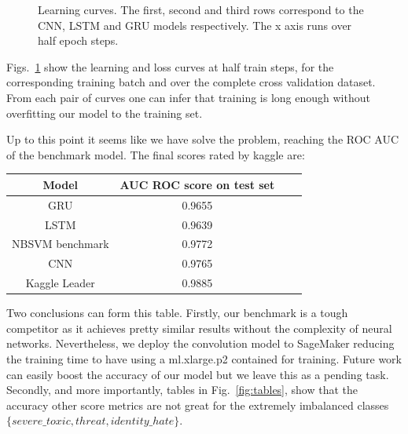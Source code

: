 \documentclass{report}
\begin{document}
\begin{figure}[!t]
{}\qquad
{}
\caption{Learning curves. The first, second and third rows correspond
to the CNN, LSTM and GRU models respectively. The x axis runs over half epoch steps.}\label{fig:curves}
\end{figure}

Figs.~\ref{fig:curves} show the learning and loss curves at
half train steps, for the corresponding training batch and over the complete 
cross validation dataset. From each pair of curves one can infer that training is
long enough without overfitting our model to the training set. 


Up to this point it seems like we have solve the problem, reaching the ROC AUC of 
the benchmark model. The final scores rated by kaggle are:
\begin{center}
\begin{tabular}{ |c|c|c|c| } 
\hline
 Model & AUC ROC score on test set\\
 \hline
GRU & 0.9655 \\ 
LSTM & 0.9639 \\ 
NBSVM benchmark&  0.9772 \\ 
CNN & 0.9765\\
Kaggle Leader & 0.9885\\
\hline
\end{tabular}
\end{center}
Two conclusions can form this table. Firstly, our benchmark is a tough competitor as it 
achieves pretty similar results without the complexity of neural networks. Nevertheless, 
we deploy the convolution model to SageMaker reducing the training time to have using a 
ml.xlarge.p2 contained for training. Future work can easily boost the accuracy of our model 
but we leave this as a pending task. Secondly, and more importantly, tables in  
Fig.~\ref{fig:tables}, show that the accuracy other score metrics are not great 
for the extremely imbalanced classes $\{severe\_toxic, threat ,
identity\_hate\}$. 
\end{document}
